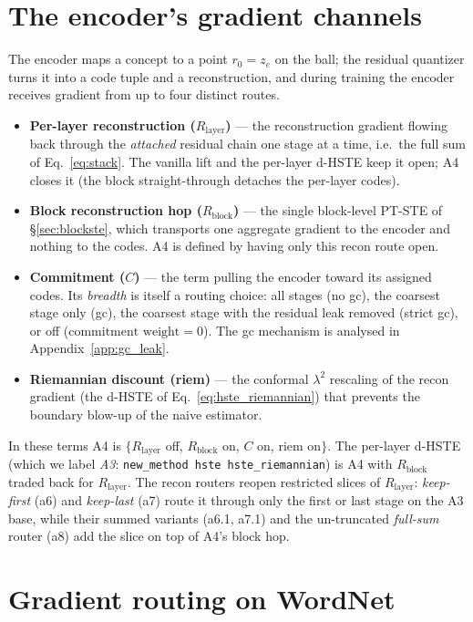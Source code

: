 \documentclass[12pt]{report}
\begin{document}
\section{The encoder's gradient channels}
\label{sec:abl_channels}

The encoder maps a concept to a point $r_0=z_e$ on the ball; the residual quantizer turns it into a code tuple and a reconstruction, and during training the encoder receives gradient from up to four distinct routes.

\begin{itemize}
\item \textbf{Per-layer reconstruction ($R_{\text{layer}}$)} --- the reconstruction gradient flowing back through the \emph{attached} residual chain one stage at a time, i.e.\ the full sum of Eq.~\ref{eq:stack}. The vanilla lift and the per-layer d-HSTE keep it open; A4 closes it (the block straight-through detaches the per-layer codes).
\item \textbf{Block reconstruction hop ($R_{\text{block}}$)} --- the single block-level PT-STE of \S\ref{sec:blockste}, which transports one aggregate gradient to the encoder and nothing to the codes. A4 is defined by having only this recon route open.
\item \textbf{Commitment ($C$)} --- the term pulling the encoder toward its assigned codes. Its \emph{breadth} is itself a routing choice: all stages (no gc), the coarsest stage only (gc), the coarsest stage with the residual leak removed (strict gc), or off ($\text{commitment weight}=0$). The gc mechanism is analysed in Appendix~\ref{app:gc_leak}.
\item \textbf{Riemannian discount (riem)} --- the conformal $\lambda^2$ rescaling of the recon gradient (the d-HSTE of Eq.~\ref{eq:hste_riemannian}) that prevents the boundary blow-up of the naive estimator.
\end{itemize}

In these terms A4 is $\{R_{\text{layer}}$ off, $R_{\text{block}}$ on, $C$ on, riem on$\}$. The per-layer d-HSTE (which we label \emph{A3}: \texttt{new\_method hste hste\_riemannian}) is A4 with $R_{\text{block}}$ traded back for $R_{\text{layer}}$. The recon routers reopen restricted slices of $R_{\text{layer}}$: \emph{keep-first} (a6) and \emph{keep-last} (a7) route it through only the first or last stage on the A3 base, while their summed variants (a6.1, a7.1) and the un-truncated \emph{full-sum} router (a8) add the slice on top of A4's block hop.

\section{Gradient routing on WordNet}
\label{sec:abl_nlp}
\end{document}
